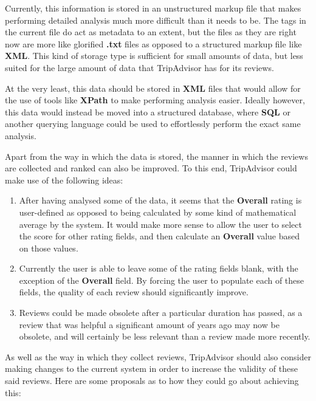 \documentclass{article}
\begin{document}
	Currently, this information is stored in an unstructured markup file that makes performing detailed analysis much more difficult than it needs to be. The tags in the current file do act as metadata to an extent, but the files as they are right now are more like glorified \textbf{.txt} files as opposed to a structured markup file like \textbf{XML}. This kind of storage type is sufficient for small amounts of data, but less suited for the large amount of data that TripAdvisor has for its reviews. 
	
	At the very least, this data should be stored in \textbf{XML} files that would allow for the use of tools like \textbf{XPath} to make performing analysis easier. Ideally however, this data would instead be moved into a structured database, where \textbf{SQL} or another querying language could be used to effortlessly perform the exact same analysis. 
	
	Apart from the way in which the data is stored, the manner in which the reviews are collected and ranked can also be improved. To this end, TripAdvisor could make use of the following ideas:
	
	\begin{enumerate}
		\item After having analysed some of the data, it seems that the \textbf{Overall} rating is user-defined as opposed to being calculated by some kind of mathematical average by the system. It would make more sense to allow the user to select the score for other rating fields, and then calculate an \textbf{Overall} value based on those values.
		\item Currently the user is able to leave some of the rating fields blank, with the exception of the \textbf{Overall} field. By forcing the user to populate each of these fields, the quality of each review should significantly improve.
		\item Reviews could be made obsolete after a particular duration has passed, as a review that was helpful a significant amount of years ago may now be obsolete, and will certainly be less relevant than a review made more recently.
	\end{enumerate}

	\newpage
	As well as the way in which they collect reviews, TripAdvisor should also consider making changes to the current system in order to increase the validity of these said reviews. Here are some proposals as to how they could go about achieving this:
	
\end{document}
